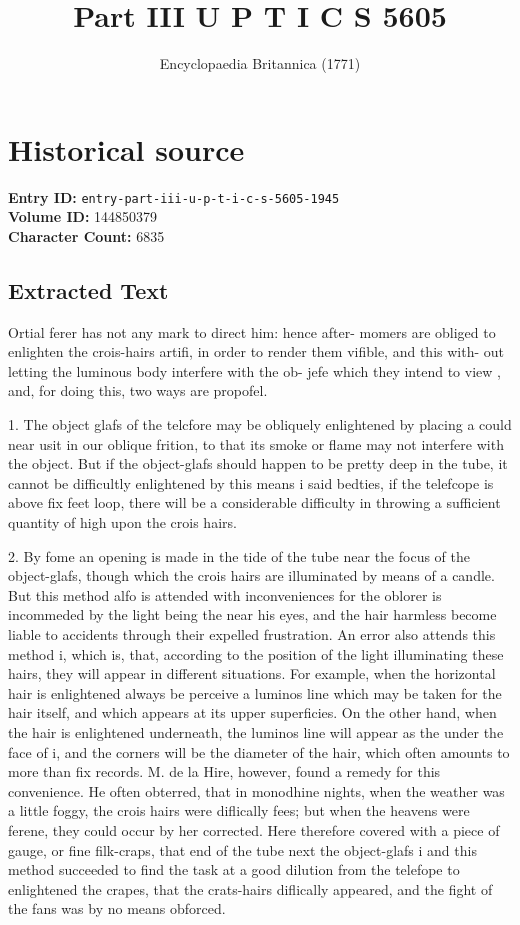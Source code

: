 \documentclass{article}
\title{Part III U P T I C S 5605}
\date{Encyclopaedia Britannica (1771)}
\begin{document}
\maketitle

\section*{Historical source}
\textbf{Entry ID:} \texttt{entry-part-iii-u-p-t-i-c-s-5605-1945} \\
\textbf{Volume ID:} 144850379 \\
\textbf{Character Count:} 6835

\subsection*{Extracted Text}
Ortial ferer has not any mark to direct him: hence after- momers are obliged to enlighten the crois-hairs artifi, in order to render them vifible, and this with- out letting the luminous body interfere with the ob- jefe which they intend to view , and, for doing this, two ways are propofel.

1. The object glafs of the telcfore may be obliquely enlightened by placing a could near usit in our oblique frition, to that its smoke or flame may not interfere with the object. But if the object-glafs should happen to be pretty deep in the tube, it cannot be difficultly enlightened by this means i said bedties, if the telefcope is above fix feet loop, there will be a considerable difficulty in throwing a sufficient quantity of high upon the crois hairs.

2. By fome an opening is made in the tide of the tube near the focus of the object-glafs, though which the crois hairs are illuminated by means of a candle. But this method alfo is attended with inconveniences for the oblorer is incommeded by the light being the near his eyes, and the hair harmless become liable to accidents through their expelled frustration. An error also attends this method i, which is, that, according to the position of the light illuminating these hairs, they will appear in different situations. For example, when the horizontal hair is enlightened always be perceive a luminos line which may be taken for the hair itself, and which appears at its upper superficies. On the other hand, when the hair is enlightened underneath, the luminos line will appear as the under the face of i, and the corners will be the diameter of the hair, which often amounts to more than fix records. M. de la Hire, however, found a remedy for this convenience. He often obterred, that in monodhine nights, when the weather was a little foggy, the crois hairs were diflically fees; but when the heavens were ferene, they could occur by her corrected. Here therefore covered with a piece of gauge, or fine filk-craps, that end of the tube next the object-glafs i and this method succeeded to find the task at a good dilution from the telefope to enlightened the crapes, that the crats-hairs diflically appeared, and the fight of the fans was by no means obforced.
\end{document}
